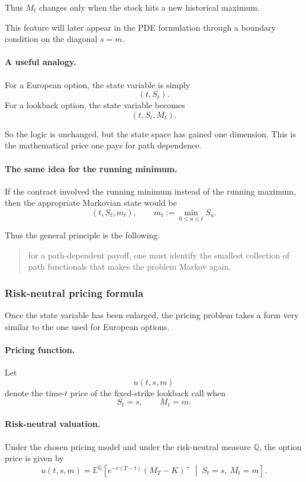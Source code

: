 \documentclass[11pt]{article}
\newcommand{\Qbb}{\mathbb{Q}}
\newcommand{\E}{\mathbb{E}}
\theoremstyle{plain}
\theoremstyle{definition}
\theoremstyle{remark}
\begin{document}
Thus \(M_t\) changes only when the stock hits a new historical maximum.

This feature will later appear in the PDE formulation through a boundary
condition on the diagonal \(s=m\).

\paragraph{A useful analogy.}
For a European option, the state variable is simply
\[
(t,S_t).
\]
For a lookback option, the state variable becomes
\[
(t,S_t,M_t).
\]

So the logic is unchanged, but the state space has gained one dimension.
This is the mathematical price one pays for path dependence.

\paragraph{The same idea for the running minimum.}
If the contract involved the running minimum instead of the running
maximum, then the appropriate Markovian state would be
\[
(t,S_t,m_t),
\qquad
m_t:=\min_{0\le u\le t}S_u.
\]

Thus the general principle is the following:
\begin{quote}
for a path-dependent payoff, one must identify the smallest collection
of path functionals that makes the problem Markov again.
\end{quote}

\subsubsection{Risk-neutral pricing formula}

Once the state variable has been enlarged, the pricing problem takes a
form very similar to the one used for European options.

\paragraph{Pricing function.}
Let
\[
u(t,s,m)
\]
denote the time-\(t\) price of the fixed-strike lookback call when
\[
S_t=s,
\qquad
M_t=m.
\]

\paragraph{Risk-neutral valuation.}
Under the chosen pricing model and under the risk-neutral measure
\(\Qbb\), the option price is given by
\[
\boxed{
u(t,s,m)
=
\E^\Qbb\!\left[
e^{-r(T-t)}(M_T-K)^+
\;\middle|\;
S_t=s,\ M_t=m
\right].
}
\]
\end{document}
